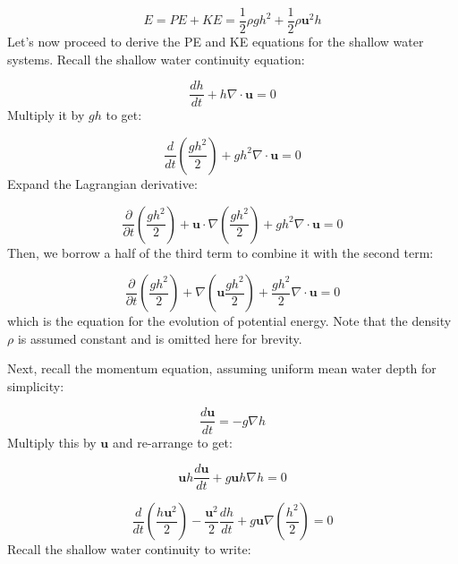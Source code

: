 \documentclass[12pt]{article}
\numberwithin{equation}{section}
\numberwithin{figure}{section}
\numberwithin{table}{section}
\begin{document}
\begin{equation}
  E = PE + KE = \frac{1}{2} \rho g h^2 + \frac{1}{2} \rho \mathbf{u}^2 h
\end{equation}
Let's now proceed to derive the PE and KE equations for the shallow water
systems.
Recall the shallow water continuity equation:

\begin{equation}
  \frac{dh}{dt} + h \nabla \cdot \mathbf{u} = 0
\end{equation}
Multiply it by $gh$ to get:

\begin{equation}
  \frac{d}{dt} \left( \frac{gh^2}{2} \right) + gh^2 \nabla \cdot \mathbf{u} = 0
\end{equation}
Expand the Lagrangian derivative:

\begin{equation}
  \frac{\partial}{\partial t} \left( \frac{gh^2}{2} \right) +
  \mathbf{u} \cdot \nabla \left( \frac{gh^2}{2} \right) +
  gh^2 \nabla \cdot \mathbf{u} = 0
\end{equation}
Then, we borrow a half of the third term to combine it with the second term:

\begin{equation}
  \frac{\partial}{\partial t} \left( \frac{gh^2}{2} \right) +
  \nabla \left( \mathbf{u} \frac{gh^2}{2} \right) +
  \frac{gh^2}{2} \nabla \cdot \mathbf{u} = 0
  \label{eq:swe_potential_energy}
\end{equation}
which is the equation for the evolution of potential energy.
Note that the density $\rho$ is assumed constant and is omitted here for brevity.

Next, recall the momentum equation, assuming uniform mean water depth for
simplicity:

\begin{equation}
  \frac{d\mathbf{u}}{dt} = - g \nabla h
\end{equation}
Multiply this by $\mathbf{u}$ and re-arrange to get:

\begin{equation}
  \mathbf{u} h \frac{d\mathbf{u}}{dt} + g\mathbf{u}h\nabla h = 0
\end{equation}

\begin{equation}
  \frac{d}{dt} \left( \frac{h \mathbf{u}^2}{2} \right)
  - \frac{\mathbf{u}^2}{2} \frac{dh}{dt}
  + g\mathbf{u}\nabla \left(\frac{h^2}{2}\right)
  = 0
\end{equation}
Recall the shallow water continuity to write:
\end{document}
